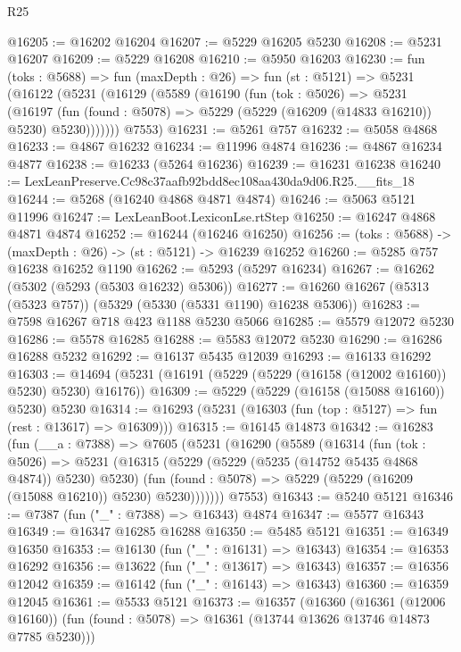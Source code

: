 \begin{lexlean}{R25}
\begin{coremodule}
@16205 := @16202 @16204
@16207 := @5229 @16205 @5230
@16208 := @5231 @16207
@16209 := @5229 @16208
@16210 := @5950 @16203
@16230 := fun (toks : @5688) =>
  fun (maxDepth : @26) =>
  fun (st : @5121) =>
  @5231
    (@16122
      (@5231
        (@16129
          (@5589
            (@16190
              (fun (tok : @5026) =>
              @5231
                (@16197
                  (fun (found : @5078) => @5229 (@5229 (@16209 (@14833 @16210)) @5230) @5230)))))))
      @7553)
@16231 := @5261 @757
@16232 := @5058 @4868
@16233 := @4867 @16232
@16234 := @11996 @4874
@16236 := @4867 @16234 @4877
@16238 := @16233 (@5264 @16236)
@16239 := @16231 @16238
@16240 := LexLeanPreserve.Cc98c37aafb92bdd8ec108aa430da9d06.R25.__fits_18
@16244 := @5268 (@16240 @4868 @4871 @4874)
@16246 := @5063 @5121 @11996
@16247 := LexLeanBoot.LexiconLse.rtStep
@16250 := @16247 @4868 @4871 @4874
@16252 := @16244 (@16246 @16250)
@16256 := (toks : @5688) -> (maxDepth : @26) -> (st : @5121) -> @16239 @16252
@16260 := @5285 @757 @16238 @16252 @1190
@16262 := @5293 (@5297 @16234)
@16267 := @16262 (@5302 (@5293 (@5303 @16232) @5306))
@16277 := @16260 @16267 (@5313 (@5323 @757)) (@5329 (@5330 (@5331 @1190) @16238 @5306))
@16283 := @7598 @16267 @718 @423 @1188 @5230 @5066
@16285 := @5579 @12072 @5230
@16286 := @5578 @16285
@16288 := @5583 @12072 @5230
@16290 := @16286 @16288 @5232
@16292 := @16137 @5435 @12039
@16293 := @16133 @16292
@16303 := @14694 (@5231 (@16191 (@5229 (@5229 (@16158 (@12002 @16160)) @5230) @5230) @16176))
@16309 := @5229 (@5229 (@16158 (@15088 @16160)) @5230) @5230
@16314 := @16293 (@5231 (@16303 (fun (top : @5127) => fun (rest : @13617) => @16309)))
@16315 := @16145 @14873
@16342 := @16283
    (fun (__a : @7388) =>
    @7605
      (@5231
        (@16290
          (@5589
            (@16314
              (fun (tok : @5026) =>
              @5231
                (@16315
                  (@5229 (@5229 (@5235 (@14752 @5435 @4868 @4874)) @5230) @5230)
                  (fun (found : @5078) => @5229 (@5229 (@16209 (@15088 @16210)) @5230) @5230)))))))
      @7553)
@16343 := @5240 @5121
@16346 := @7387 (fun ("_" : @7388) => @16343) @4874
@16347 := @5577 @16343
@16349 := @16347 @16285 @16288
@16350 := @5485 @5121
@16351 := @16349 @16350
@16353 := @16130 (fun ("_" : @16131) => @16343)
@16354 := @16353 @16292
@16356 := @13622 (fun ("_" : @13617) => @16343)
@16357 := @16356 @12042
@16359 := @16142 (fun ("_" : @16143) => @16343)
@16360 := @16359 @12045
@16361 := @5533 @5121
@16373 := @16357
    (@16360
      (@16361 (@12006 @16160))
      (fun (found : @5078) => @16361 (@13744 @13626 @13746 @14873 @7785 @5230)))

\end{coremodule}
\end{lexlean}

